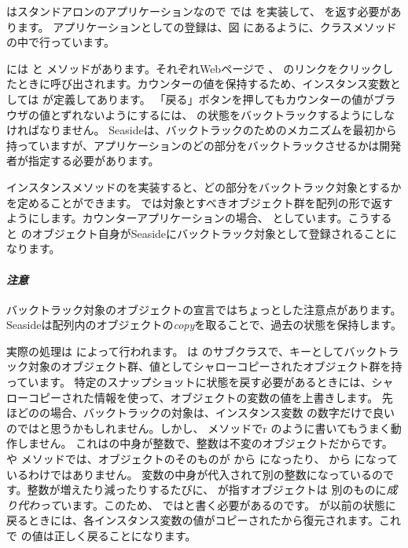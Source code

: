 \documentclass[a4paper,10pt,twoside]{book}
\begin{document}
  はスタンドアロンのアプリケーションなので  では   を実装して、 を返す必要があります。
 アプリケーションとしての登録は、図 にあるように、クラスメソッド の中で行っています。

 には  と メソッドがあります。それぞれWebページで \link{++} 、 \link{--\,--} のリンクをクリックしたときに呼び出されます。カウンターの値を保持するため、インスタンス変数としては が定義してあります。
「戻る」ボタンを押してもカウンターの値がブラウザの値とずれないようにするには、 の状態をバックトラックするようにしなければなりません。
Seasideは、バックトラックのためのメカニズムを最初から持っていますが、アプリケーションのどの部分をバックトラックさせるかは開発者が指定する必要があります。

インスタンスメソッドのを実装すると、どの部分をバックトラック対象とするかを定めることができます。
 では対象とすべきオブジェクト群を配列の形で返すようにします。カウンターアプリケーションの場合、 としています。こうすると  のオブジェクト自身がSeasideにバックトラック対象として登録されることになります。

\paragraph{\emph{注意}}
バックトラック対象のオブジェクトの宣言ではちょっとした注意点があります。
Seasideは配列内のオブジェクトの\emph{copy}を取ることで、過去の状態を保持します。

実際の処理は  によって行われます。 は  のサブクラスで、キーとしてバックトラック対象のオブジェクト群、値としてシャローコピーされたオブジェクト群を持っています。
特定のスナップショットに状態を戻す必要があるときには、シャローコピーされた情報を使って、オブジェクトの変数の値を上書きします。
先ほどのの場合、バックトラックの対象は、インスタンス変数 の数字だけで良いのではと思うかもしれません。しかし、   メソッドでr のように書いてもうまく動作しません。
これはの中身が整数で、整数は不変のオブジェクトだからです。
  や  メソッドでは、オブジェクトのそのものが から  になったり、 から になっているわけではありません。
  変数の中身が代入されて別の整数になっているのです。整数が増えたり減ったりするたびに、  が指すオブジェクトは 別のものに\emph{成り代わって}います。このため、 ではと書く必要があるのです。 \mbox{} が以前の状態に戻るときには、各インスタンス変数の値がコピーされた\mbox{}から復元されます。これで  の値は正しく戻ることになります。
\end{document}
